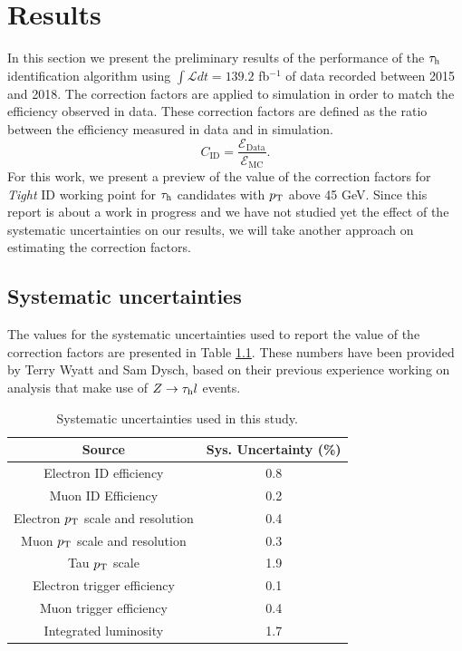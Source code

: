 \chapter{Results}\label{chap5}
In this section we present the preliminary results of the performance of the $\tau_\text{h}$ identification algorithm using $\int\mathcal{L} dt=139.2$ fb$^{-1}$ of data recorded between 2015 and 2018.
The correction factors are applied to simulation in order to match the efficiency observed in data. These correction factors are defined as the ratio between the efficiency measured in data and in simulation.
\begin{equation}
C_{\text{ID}}=\frac{\mathcal{E}_{\text{Data}}}{\mathcal{E}_{\text{MC}}}.
\end{equation}
For this work, we present a preview of the value of the correction factors for \textit{Tight} ID working point for $\tau_\text{h}$ candidates with $p_\text{T}$ above 45 GeV. Since this report is about a work in progress and we have not studied yet the effect of the systematic uncertainties on our results, we will take another approach on estimating the correction factors.

\section{Systematic uncertainties}
The values for the systematic uncertainties used to report the value of the correction factors are presented in Table \ref{Tab5}. These numbers have been provided by Terry Wyatt and Sam Dysch, based on their previous experience working on analysis that make use of $Z\to\tau_\text{h} l$ events.
\begin{table}[]
	\centering
	\begin{tabular}{cc}
		\hline
		\multicolumn{1}{|c|}{Source}        & \multicolumn{1}{c|}{Sys. Uncertainty (\%)} \\ \hline
		Electron ID efficiency              & 0.8                                        \\
		Muon ID Efficiency                  & 0.2                                        \\
		Electron $p_\text{T}$ scale and resolution & 0.4                                        \\
		Muon $p_\text{T}$ scale and resolution     & 0.3                                        \\
		Tau $p_\text{T}$ scale                     & 1.9                                        \\
		Electron trigger efficiency         & 0.1                                        \\
		Muon trigger efficiency             & 0.4                                        \\ 
		Integrated luminosity               & 1.7                                        \\ \hline
	\end{tabular}
	\caption{Systematic uncertainties used in this study.}
	\label{Tab5}
\end{table}
